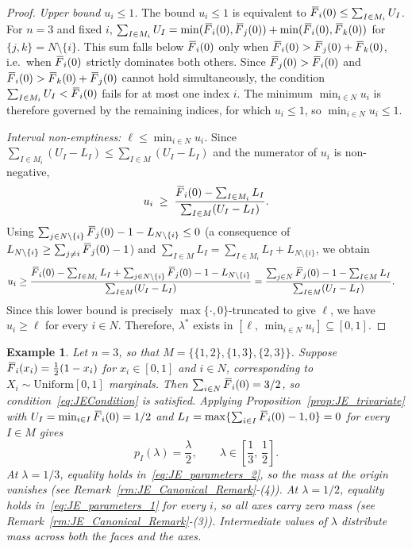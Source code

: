 \documentclass[letterpaper,12pt]{article}
\numberwithin{equation}{section}
\newtheorem{example}[theorem]{Example}
\newcommand{\N}{{N}}
\newcommand{\M}{{M}}
\newcommand{\I}{{I}}
\newcommand{\F}{\,\overline{\kern-0.175em F\kern-0em}}
\begin{document}
{\begin{proof}
\smallskip
\noindent\textit{Upper bound $u_i\le1$.}
The bound $u_i\le1$ is equivalent to $\F_i(0)\le\sum_{\I\in\M_i}U_\I$. For
$n=3$ and fixed $i$, $\sum_{\I\in\M_i}U_\I=\min(\F_i(0),\F_j(0))+\min(\F_i(0),\F_k(0))$
for $\{j,k\}=\N\setminus\{i\}$. This sum falls below $\F_i(0)$ only when
$\F_i(0)>\F_j(0)+\F_k(0)$, i.e.\ when $\F_i(0)$ strictly dominates both others.
Since $\F_j(0)>\F_i(0)$ and $\F_i(0)>\F_k(0)+\F_j(0)$ cannot hold simultaneously,
the condition $\sum_{\I\in\M_i}U_\I<\F_i(0)$ fails for at most one index $i$.
The minimum $\min_{i\in\N}u_i$ is therefore governed by the remaining indices, for
which $u_i\le1$, so $\min_{i\in\N}u_i\le1$.

\smallskip
\noindent\textit{Interval non-emptiness: $\ell\le\min_{i\in\N}u_i$.}
Since $\sum_{\I\in\M_i}(U_\I-L_\I)\le\sum_{\I\in\M}(U_\I-L_\I)$ and the
numerator of $u_i$ is non-negative,
\[
u_i\;\ge\;\frac{\F_i(0)-\sum_{\I\in\M_i}L_{\I}}{\sum_{\I\in\M}(U_{\I}-L_{\I})}.
\]
Using $\sum_{j\in\N\setminus\{i\}}\F_j(0)-1-L_{\N\setminus\{i\}}\le0$ (a
consequence of $L_{\N\setminus\{i\}}\ge\sum_{j\ne i}\F_j(0)-1$) and
$\sum_{\I\in\M}L_\I=\sum_{\I\in\M_i}L_\I+L_{\N\setminus\{i\}}$, we obtain
\begin{align*}
u_i
&\ge\frac{\F_i(0)-\sum_{\I\in\M_i}L_{\I}+\sum_{j\in\N\setminus\{i\}}\F_j(0)
         -1-L_{\N\setminus\{i\}}}{\sum_{\I\in\M}(U_{\I}-L_{\I})}
 =\frac{\sum_{j\in\N}\F_j(0)-1-\sum_{\I\in\M}L_{\I}}
       {\sum_{\I\in\M}(U_{\I}-L_{\I})}.
\end{align*}
Since this lower bound is precisely $\max\{\cdot,0\}$-truncated to give $\ell$,
we have $u_i\ge\ell$ for every $i\in\N$. Therefore, $\lambda^*$ exists in
$[\ell,\,\min_{i\in\N}u_i]\subseteq[0,1]$.
\end{proof}

\begin{example}
\label{ex:JE_canonical_example}
Let $n=3$, so that $\M=\bigl\{\{1,2\},\{1,3\},\{2,3\}\bigr\}$. Suppose
$\F_i(x_i)=\tfrac{1}{2}(1-x_i)$ for $x_i\in[0,1]$ and $i\in\N$, corresponding
to $X_i\sim\mathrm{Uniform}[0,1]$ marginals. Then $\sum_{i\in\N}\F_i(0)=3/2$,
so condition~\eqref{eq:JECondition} is satisfied. Applying
Proposition~\ref{prop:JE_trivariate} with $U_\I=\min_{i\in\I}\F_i(0)=1/2$ and
$L_\I=\max\{\sum_{i\in\I}\F_i(0)-1,0\}=0$ for every $\I\in\M$ gives
\[
p_{\I}(\lambda)=\frac{\lambda}{2},
\qquad
\lambda\in\left[\frac{1}{3},\,\frac{1}{2}\right].
\]
At $\lambda=1/3$, equality holds in~\eqref{eq:JE_parameters_2}, so the mass at
the origin vanishes (see Remark~\ref{rm:JE_Canonical_Remark}-(4)). At
$\lambda=1/2$, equality holds in~\eqref{eq:JE_parameters_1} for every $i$, so
all axes carry zero mass (see Remark~\ref{rm:JE_Canonical_Remark}-(3)).
Intermediate values of $\lambda$ distribute mass across both the faces and the
axes.


\end{example}}
\end{document}
